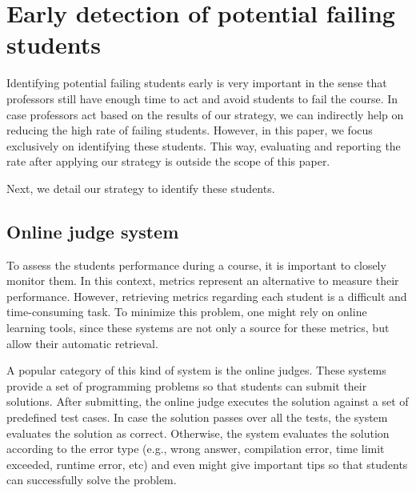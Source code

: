 \section{Early detection of potential failing students}

\label{sec:strategy}

Identifying potential failing students early is very important in the sense that professors still have enough time to act and avoid students to fail the course. In case professors act based on the results of our strategy, we can indirectly help on reducing the high rate of failing students. However, in this paper, we focus exclusively on identifying these students. This way, evaluating and reporting the rate after applying our strategy is outside the scope of this paper.

Next, we detail our strategy to identify these students.

\subsection{Online judge system}

To assess the students performance during a course, it is important to closely monitor them. In this context, metrics represent an alternative to measure their performance. However, retrieving metrics regarding each student is a difficult and time-consuming task. To minimize this problem, one might rely on online learning tools, since these systems are not only a source for these metrics, but allow their automatic retrieval. 

A popular category of this kind of system is the online judges. These systems provide a set of programming problems so that students can submit their solutions. After submitting, the online judge executes the solution against a set of predefined test cases. In case the solution passes over all the tests, the system evaluates the solution as correct. Otherwise, the system evaluates the solution according to the error type (e.g., wrong answer, compilation error, time limit exceeded, runtime error, etc) and even might give important tips so that students can successfully solve the problem.

